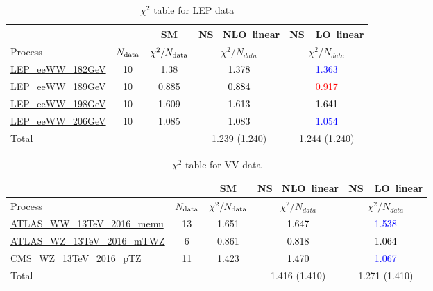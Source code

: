 \documentclass{article}
\begin{document}
\begin{table}[H]
\centering
\begin{tabular}{|l|c|c|c|c|}
\hline
 \multicolumn{2}{|c|}{} & SM& \rm NS \ NLO\ linear& \rm NS\ \ LO\ linear\\ \hline
Process & $N_{\rm data}$ & $\chi^ 2/N_{\rm data}$& $\chi^ 2/N_{data}$& $\chi^ 2/N_{data}$\\ \hline
\href{https://arxiv.org/abs/1302.3415}{LEP_eeWW_182GeV} & 10 & 1.38 & \textcolor{black}                            {1.378} & \textcolor{blue}                            {1.363} \\ \hline
\href{https://arxiv.org/abs/1302.3415}{LEP_eeWW_189GeV} & 10 & 0.885 & \textcolor{black}                            {0.884} & \textcolor{red}                            {0.917} \\ \hline
\href{https://arxiv.org/abs/1302.3415}{LEP_eeWW_198GeV} & 10 & 1.609 & \textcolor{black}                            {1.613} & \textcolor{black}                            {1.641} \\ \hline
\href{https://arxiv.org/abs/1302.3415}{LEP_eeWW_206GeV} & 10 & 1.085 & \textcolor{black}                            {1.083} & \textcolor{blue}                            {1.054} \\ \hline
\hline Total & &  & 1.239 (1.240) & 1.244 (1.240) \\ \hline
\end{tabular}
\caption{$\chi^2$ table for LEP data}
\end{table}
\begin{table}[H]
\centering
\begin{tabular}{|l|c|c|c|c|}
\hline
 \multicolumn{2}{|c|}{} & SM& \rm NS \ NLO\ linear& \rm NS\ \ LO\ linear\\ \hline
Process & $N_{\rm data}$ & $\chi^ 2/N_{\rm data}$& $\chi^ 2/N_{data}$& $\chi^ 2/N_{data}$\\ \hline
\href{https://arxiv.org/abs/1905.04242}{ATLAS_WW_13TeV_2016_memu} & 13 & 1.651 & \textcolor{black}                            {1.647} & \textcolor{blue}                            {1.538} \\ \hline
\href{https://arxiv.org/abs/1902.05759}{ATLAS_WZ_13TeV_2016_mTWZ} & 6 & 0.861 & \textcolor{black}                            {0.818} & \textcolor{black}                            {1.064} \\ \hline
\href{https://arxiv.org/abs/1901.03428}{CMS_WZ_13TeV_2016_pTZ} & 11 & 1.423 & \textcolor{black}                            {1.470} & \textcolor{blue}                            {1.067} \\ \hline
\hline Total & &  & 1.416 (1.410) & 1.271 (1.410) \\ \hline
\end{tabular}
\caption{$\chi^2$ table for VV data}
\end{table}
\end{document}
